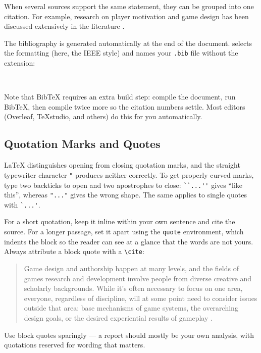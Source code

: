 \documentclass[a4paper,twoside,twocolumn]{IEEEtran}
\begin{document}
When several sources support the same statement, they can be grouped into one citation.
For example, research on player motivation and game design has been discussed extensively
in the literature \cite{rigby2011immersion,salen2005game,hunicke2004mda}.

The bibliography is generated automatically at the end of the document.
\verb|| selects the formatting (here, the IEEE style) and
\verb|| names your \texttt{.bib} file without the extension:

\begin{verbatim}


\end{verbatim}

Note that BibTeX requires an extra build step: compile the document, run BibTeX,
then compile twice more so the citation numbers settle. Most editors (Overleaf,
TeXstudio, and others) do this for you automatically.

\subsection{Quotation Marks and Quotes}

LaTeX distinguishes opening from closing quotation marks, and the straight
typewriter character \verb|"| produces neither correctly. To get properly curved
marks, type two backticks to open and two apostrophes to close:
\verb|``...''| gives ``like this'', whereas \verb|"..."| gives the wrong shape.
The same applies to single quotes with \verb|`...'|.

For a short quotation, keep it inline within your own sentence and cite the
source. For a longer passage, set it apart using the \verb|quote| environment,
which indents the block so the reader can see at a glance that the words are not
yours. Always attribute a block quote with a \verb|\cite|:

\begin{quote}
Game design and authorship happen at many levels, and the fields of games
research and development involve people from diverse creative and scholarly
backgrounds. While it's often necessary to focus on one area, everyone,
regardless of discipline, will at some point need to consider issues outside
that area: base mechanisms of game systems, the overarching design goals, or the
desired experiential results of gameplay \cite{hunicke2004mda}.
\end{quote}

Use block quotes sparingly --- a report should mostly be your own analysis, with
quotations reserved for wording that matters.
\end{document}
